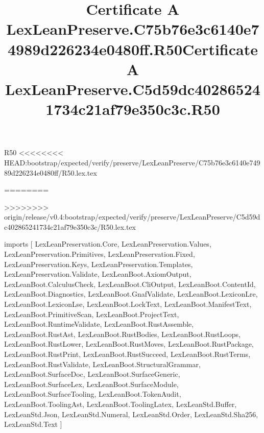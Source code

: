 \begin{lexlean}{R50}
<<<<<<<< HEAD:bootstrap/expected/verify/preserve/LexLeanPreserve/C75b76e3c6140e74989d226234e0480ff/R50.lex.tex
\title{Certificate A LexLeanPreserve.C75b76e3c6140e74989d226234e0480ff.R50}
========
\title{Certificate A LexLeanPreserve.C5d59dc402865241734c21af79e350c3c.R50}
>>>>>>>> origin/release/v0.4:bootstrap/expected/verify/preserve/LexLeanPreserve/C5d59dc402865241734c21af79e350c3c/R50.lex.tex
\begin{coremodule}
imports [
  LexLeanPreservation.Core,
  LexLeanPreservation.Values,
  LexLeanPreservation.Primitives,
  LexLeanPreservation.Fixed,
  LexLeanPreservation.Keys,
  LexLeanPreservation.Templates,
  LexLeanPreservation.Validate,
  LexLeanBoot.AxiomOutput,
  LexLeanBoot.CalculusCheck,
  LexLeanBoot.CliOutput,
  LexLeanBoot.ContentId,
  LexLeanBoot.Diagnostics,
  LexLeanBoot.GnafValidate,
  LexLeanBoot.LexiconLre,
  LexLeanBoot.LexiconLse,
  LexLeanBoot.LockText,
  LexLeanBoot.ManifestText,
  LexLeanBoot.PrimitiveScan,
  LexLeanBoot.ProjectText,
  LexLeanBoot.RuntimeValidate,
  LexLeanBoot.RustAssemble,
  LexLeanBoot.RustAst,
  LexLeanBoot.RustBodies,
  LexLeanBoot.RustLoops,
  LexLeanBoot.RustLower,
  LexLeanBoot.RustMoves,
  LexLeanBoot.RustPackage,
  LexLeanBoot.RustPrint,
  LexLeanBoot.RustSucceed,
  LexLeanBoot.RustTerms,
  LexLeanBoot.RustValidate,
  LexLeanBoot.StructuralGrammar,
  LexLeanBoot.SurfaceDoc,
  LexLeanBoot.SurfaceGeneric,
  LexLeanBoot.SurfaceLex,
  LexLeanBoot.SurfaceModule,
  LexLeanBoot.SurfaceTooling,
  LexLeanBoot.TokenAudit,
  LexLeanBoot.ToolingAst,
  LexLeanBoot.ToolingLatex,
  LexLeanStd.Buffer,
  LexLeanStd.Json,
  LexLeanStd.Numeral,
  LexLeanStd.Order,
  LexLeanStd.Sha256,
  LexLeanStd.Text
]


\end{coremodule}
\end{lexlean}

